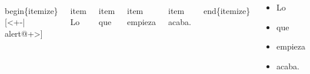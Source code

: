 \documentclass[11pt]{beamer}
\begin{document}
\begin{frame}

\begin{block}{}

\begin{columns}
\begin{semiverbatim}\scriptsize
\\begin\{itemize\}[<+-| alert@+>]
\end{semiverbatim}

\begin{semiverbatim}\scriptsize
 \\item Lo
\end{semiverbatim}

\begin{semiverbatim}\scriptsize
 \\item que
\end{semiverbatim}

\begin{semiverbatim}\scriptsize
 \\item empieza
\end{semiverbatim}

\begin{semiverbatim}\scriptsize
 \\item acaba.
\end{semiverbatim}

\begin{semiverbatim}\scriptsize
\\end\{itemize\}
\end{semiverbatim}



\begin{itemize}
 \item<+-| alert@+> Lo   \item<+-| alert@+> que  \item<+-| alert@+> empieza
\item<+-| alert@+> acaba.
\end{itemize}


\end{columns}
\end{block}






\end{frame}
\end{document}
